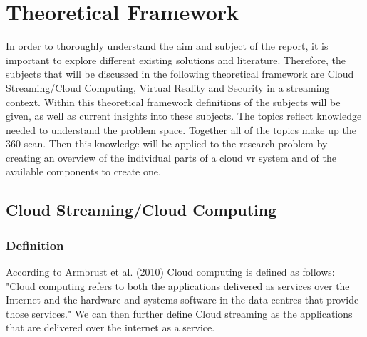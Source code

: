 \section{Theoretical Framework}
\label{sec:theo}
In order to thoroughly understand the aim and subject of the report, it is important to explore different existing solutions and literature. Therefore, the subjects that will be discussed in the following theoretical framework are Cloud Streaming/Cloud Computing, Virtual Reality and Security in a streaming context. Within this theoretical framework definitions of the subjects will be given, as well as current insights into these subjects. The topics reflect knowledge needed to understand the problem space. Together all of the topics make up the 360 scan. Then this knowledge will be applied to the research problem by creating an overview of the individual parts of a cloud \acrshort{vr} system and of the available components to create one. 
\subsection{Cloud Streaming/Cloud Computing}

\subsubsection{Definition}
According to Armbrust et al. (2010) Cloud computing is defined as follows: 
"Cloud computing refers to both the applications delivered as services over the Internet and the hardware and systems software in the data centres that provide those services." \parencite{aviewoncc}
We can then further define Cloud streaming as the applications that are delivered over the internet as a service.

